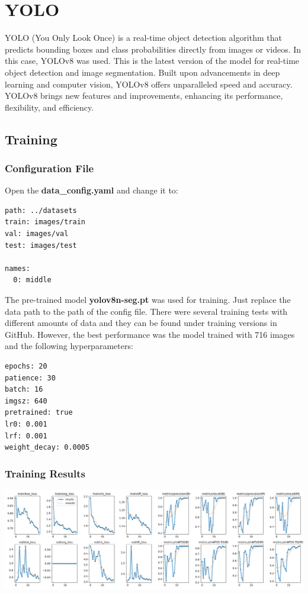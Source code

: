 \documentclass[12pt]{article}
\begin{document}
\section{YOLO}
YOLO (You Only Look Once) is a real-time object detection algorithm that predicts bounding boxes and class probabilities directly from images or videos. In this case, YOLOv8 was used. This is the latest version of the model for real-time object detection and image segmentation. Built upon advancements in deep learning and computer vision, YOLOv8 offers unparalleled speed and accuracy. YOLOv8 brings new features and improvements, enhancing its performance, flexibility, and efficiency.

\subsection{Training}
\subsubsection*{Configuration File}
Open the \textbf{data\_config.yaml} and change it to:
\begin{lstlisting}[language=XML]
path: ../datasets 
train: images/train  
val: images/val  
test: images/test

names:
  0: middle
\end{lstlisting}


The pre-trained model \textbf{yolov8n-seg.pt} was used for training. Just replace the data path to the path of the config file. There were several training tests with different amounts of data and they can be found under training versions in GitHub. However, the best performance was the model trained with 716 images and the following hyperparameters:
\begin{lstlisting}[language=XML]
epochs: 20
patience: 30
batch: 16
imgsz: 640
pretrained: true
lr0: 0.001
lrf: 0.001
weight_decay: 0.0005
\end{lstlisting}

\subsubsection*{Training Results}


\begin{center}
\includegraphics[width=1.0\textwidth]{Bilder/results}
\end{center}
\end{document}
